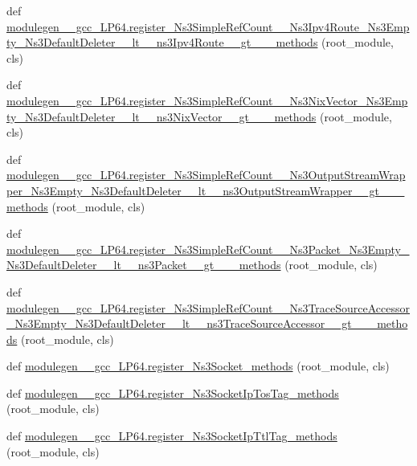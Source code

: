 \begin{DoxyCompactItemize}
\item 
def \hyperlink{namespacemodulegen____gcc__LP64_af72ddb920d39271050611f34d89a68fa}{modulegen\+\_\+\+\_\+gcc\+\_\+\+L\+P64.\+register\+\_\+\+Ns3\+Simple\+Ref\+Count\+\_\+\+\_\+\+Ns3\+Ipv4\+Route\+\_\+\+Ns3\+Empty\+\_\+\+Ns3\+Default\+Deleter\+\_\+\+\_\+lt\+\_\+\+\_\+ns3\+Ipv4\+Route\+\_\+\+\_\+gt\+\_\+\+\_\+\+\_\+methods} (root\+\_\+module, cls)
\item 
def \hyperlink{namespacemodulegen____gcc__LP64_a965e9b7942715fc406cf9c83246b2bcb}{modulegen\+\_\+\+\_\+gcc\+\_\+\+L\+P64.\+register\+\_\+\+Ns3\+Simple\+Ref\+Count\+\_\+\+\_\+\+Ns3\+Nix\+Vector\+\_\+\+Ns3\+Empty\+\_\+\+Ns3\+Default\+Deleter\+\_\+\+\_\+lt\+\_\+\+\_\+ns3\+Nix\+Vector\+\_\+\+\_\+gt\+\_\+\+\_\+\+\_\+methods} (root\+\_\+module, cls)
\item 
def \hyperlink{namespacemodulegen____gcc__LP64_a44c8825c5388fc8e7a791e3762901c2b}{modulegen\+\_\+\+\_\+gcc\+\_\+\+L\+P64.\+register\+\_\+\+Ns3\+Simple\+Ref\+Count\+\_\+\+\_\+\+Ns3\+Output\+Stream\+Wrapper\+\_\+\+Ns3\+Empty\+\_\+\+Ns3\+Default\+Deleter\+\_\+\+\_\+lt\+\_\+\+\_\+ns3\+Output\+Stream\+Wrapper\+\_\+\+\_\+gt\+\_\+\+\_\+\+\_\+methods} (root\+\_\+module, cls)
\item 
def \hyperlink{namespacemodulegen____gcc__LP64_ad03a2df5680530337afef71c06f6d20d}{modulegen\+\_\+\+\_\+gcc\+\_\+\+L\+P64.\+register\+\_\+\+Ns3\+Simple\+Ref\+Count\+\_\+\+\_\+\+Ns3\+Packet\+\_\+\+Ns3\+Empty\+\_\+\+Ns3\+Default\+Deleter\+\_\+\+\_\+lt\+\_\+\+\_\+ns3\+Packet\+\_\+\+\_\+gt\+\_\+\+\_\+\+\_\+methods} (root\+\_\+module, cls)
\item 
def \hyperlink{namespacemodulegen____gcc__LP64_a2971d479713881f4a0fb7f82a5a0c162}{modulegen\+\_\+\+\_\+gcc\+\_\+\+L\+P64.\+register\+\_\+\+Ns3\+Simple\+Ref\+Count\+\_\+\+\_\+\+Ns3\+Trace\+Source\+Accessor\+\_\+\+Ns3\+Empty\+\_\+\+Ns3\+Default\+Deleter\+\_\+\+\_\+lt\+\_\+\+\_\+ns3\+Trace\+Source\+Accessor\+\_\+\+\_\+gt\+\_\+\+\_\+\+\_\+methods} (root\+\_\+module, cls)
\item 
def \hyperlink{namespacemodulegen____gcc__LP64_af6b6e0865bdae0eff7bd232f1211b164}{modulegen\+\_\+\+\_\+gcc\+\_\+\+L\+P64.\+register\+\_\+\+Ns3\+Socket\+\_\+methods} (root\+\_\+module, cls)
\item 
def \hyperlink{namespacemodulegen____gcc__LP64_aaf00950c86db7a44df91ae8d6fb5d5ef}{modulegen\+\_\+\+\_\+gcc\+\_\+\+L\+P64.\+register\+\_\+\+Ns3\+Socket\+Ip\+Tos\+Tag\+\_\+methods} (root\+\_\+module, cls)
\item 
def \hyperlink{namespacemodulegen____gcc__LP64_a8cc4c80820dd429c465f501e2a45fe20}{modulegen\+\_\+\+\_\+gcc\+\_\+\+L\+P64.\+register\+\_\+\+Ns3\+Socket\+Ip\+Ttl\+Tag\+\_\+methods} (root\+\_\+module, cls)

\end{DoxyCompactItemize}
